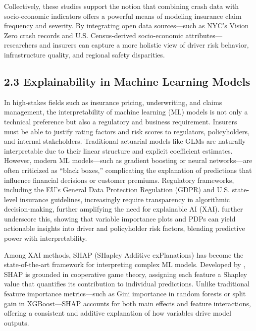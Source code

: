 \documentclass[
  number,
  review,
  3p]{elsarticle}
\begin{document}
Collectively, these studies support the notion that combining crash data
with socio-economic indicators offers a powerful means of modeling
insurance claim frequency and severity. By integrating open data
sources---such as NYC's Vision Zero crash records and U.S.
Census-derived socio-economic attributes---researchers and insurers can
capture a more holistic view of driver risk behavior, infrastructure
quality, and regional safety disparities.

\subsection{\texorpdfstring{\textbf{2.3 Explainability in Machine
Learning
Models}}{2.3 Explainability in Machine Learning Models}}\label{explainability-in-machine-learning-models}

In high-stakes fields such as insurance pricing, underwriting, and
claims management, the interpretability of machine learning (ML) models
is not only a technical preference but also a regulatory and business
requirement. Insurers must be able to justify rating factors and risk
scores to regulators, policyholders, and internal stakeholders.
Traditional actuarial models like GLMs are naturally interpretable due
to their linear structure and explicit coefficient estimates. However,
modern ML models---such as gradient boosting or neural networks---are
often criticized as ``black boxes,'' complicating the explanation of
predictions that influence financial decisions or customer premiums.
Regulatory frameworks, including the EU's General Data Protection
Regulation (GDPR) and U.S. state-level insurance guidelines,
increasingly require transparency in algorithmic decision-making,
further amplifying the need for explainable AI (XAI). \citep{henckaerts}
further underscore this, showing that variable importance plots and PDPs
can yield actionable insights into driver and policyholder risk factors,
blending predictive power with interpretability.

Among XAI methods, SHAP (SHapley Additive exPlanations) has become the
state-of-the-art framework for interpreting complex ML models. Developed
by \citep{lundberg}, SHAP is grounded in cooperative game theory,
assigning each feature a Shapley value that quantifies its contribution
to individual predictions. Unlike traditional feature importance
metrics---such as Gini importance in random forests or split gain in
XGBoost---SHAP accounts for both main effects and feature interactions,
offering a consistent and additive explanation of how variables drive
model outputs.
\end{document}
